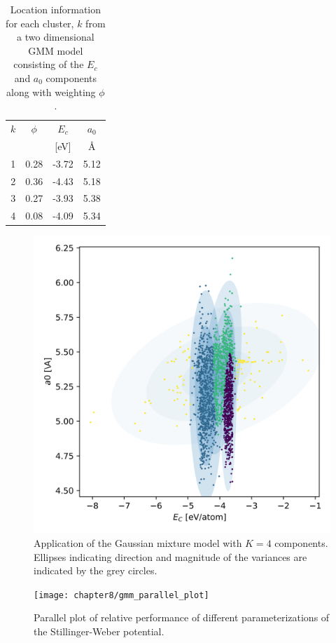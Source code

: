 \begin{table}[ht]
	\centering
	\caption{Location information for each cluster, $k$  from a two dimensional GMM model consisting of the $E_c$ and $a_0$ components along with weighting $\phi$.}
	\label{tbl:sw_2parameter_gmm}
	\begin{tabular}{c c c c}
    \hline
    $k$ & $\phi$ & $E_c$ & $a_0$ \\
        &        & [eV]  & \AA   \\
    \hline
    1 & 0.28 & -3.72  & 5.12 \\
    2 & 0.36 & -4.43  & 5.18 \\
    3 & 0.27 & -3.93  & 5.38 \\
    4 & 0.08 & -4.09  & 5.34 \\
    \hline
  \end{tabular}
\end{table}

\begin{figure}[ht]
	\centering
	\includegraphics[width=5in]{chapter8/Si_Ec_a0_gmm}
	\caption{Application of the Gaussian mixture model with $K=4$ components.  Ellipses indicating direction and magnitude of the variances are indicated by the grey circles.}
	\label{fig:Si_Ec_a0_gmm}
\end{figure}

\begin{figure}[hbt]
	\centering
	\captionsetup{justification=centering,margin=1in}
	\texttt{[image: chapter8/gmm\_parallel\_plot]}
	\caption{Parallel plot of relative performance of different parameterizations of the Stillinger-Weber potential.}
	\label{fig:Si_gmm_parallel_plot_2_qoi}
\end{figure}

